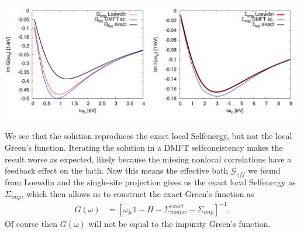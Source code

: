 \documentclass[12pt,a4paper]{scrartcl}
\numberwithin{equation}{section}
\newcommand{\unity}{\mathds{1}}
\begin{document}
\includegraphics[width=1\textwidth]{figs/reversebath/gimp_simp_dimer_loewdin.pdf}

We see that the solution reproduces the exact local Selfenergy, but not the local Green's function. 
Iterating the solution in a DMFT selfconcistency makes the result worse as expected, likely
because the missing nonlocal correlations have a feedback effect on the bath.
Now this means the effective bath $\mathcal{G}_{eff}$ we found from Loewdin and the single-site
projection gives us the exact local Selfenergy as $\Sigma_{imp}$, which then allows us to construct the exact
Green's function as
\begin{align}
 G(\omega) &= \left[ \omega_{\mu}\unity - H - \Sigma^{exact}_{nonloc} - \Sigma_{imp}  \right]^{-1}.
\end{align}
Of course then $G(\omega)$ will not be equal to the impurity Green's function.

\bigskip
\end{document}

